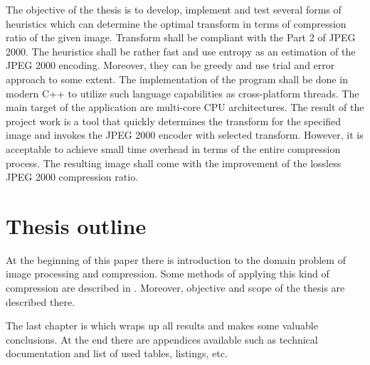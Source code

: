 The objective of the thesis is to develop, implement and test several forms of heuristics which can determine
the optimal transform in terms of compression ratio of the given image. Transform shall be compliant with
the Part 2 of JPEG 2000. The heuristics shall be rather fast and use entropy as an estimation of the JPEG 2000 encoding.
Moreover, they can be greedy and use trial and error approach to some extent. The implementation of the program
shall be done in modern C++ to utilize such language capabilities as cross-platform threads. The main target of the
application are multi-core CPU architectures. The result of the project work is a tool that quickly determines 
the transform for the specified image and invokes the JPEG 2000 encoder with selected transform. However, it is acceptable
to achieve small time overhead in terms of the entire compression process. The resulting image shall come with the
improvement of the lossless JPEG 2000 compression ratio.

\section{Thesis outline}

At the beginning of this paper there is introduction to the domain problem of image processing and compression.
Some methods of applying this kind of compression are described in . Moreover, objective and scope
of the thesis are described there. 


The last chapter is  which wraps up all results and makes some valuable conclusions.
At the end there are appendices available such as technical documentation and list of used tables, listings, etc.
